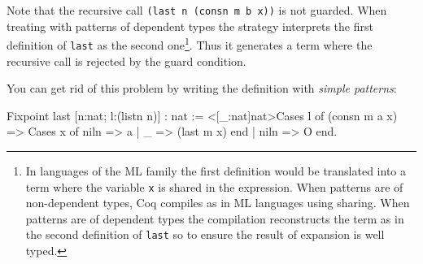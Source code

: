 \begin{itemize}
Note that the recursive call {\tt (last n (consn m b x))} is not
guarded. When treating with patterns of dependent types the strategy
interprets the first definition of \texttt{last} as the second
one\footnote{In languages of the ML family the first definition would
  be translated into a term where the variable \texttt{x} is shared in
  the expression.  When patterns are of non-dependent types, Coq
  compiles as in ML languages using sharing. When patterns are of
  dependent types the compilation reconstructs the term as in the
  second definition of \texttt{last} so to ensure the result of
  expansion is well typed.}.  Thus it generates a term where the
recursive call is rejected by the guard condition.

You can get rid of this problem by writing the definition with
\emph{simple patterns}:

\begin{coq_example}
  Fixpoint last [n:nat; l:(listn n)] : nat :=
  <[_:nat]nat>Cases l of
    (consn m a x) => Cases x of niln => a | _ => (last m x) end
  | niln => O
  end.
\end{coq_example}

\end{itemize}


